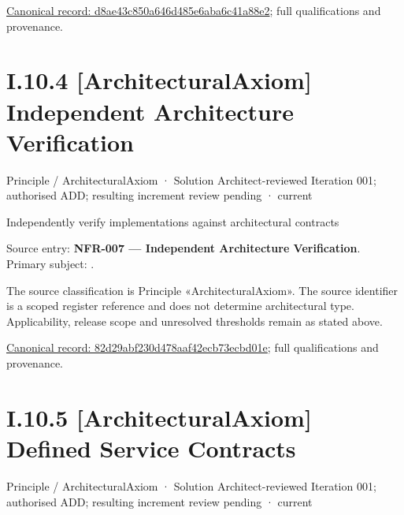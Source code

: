 {\footnotesize \href{../../../../../../../continuum/motivation/principle/architectural-axiom/d8ae43c850a646d485e6aba6c41a88e2.md}{Canonical record: d8ae43c850a646d485e6aba6c41a88e2}; full qualifications and provenance.}\par
\section*{I.10.4 [ArchitecturalAxiom] Independent Architecture Verification}
\label{navigation:I.10.4}

\label{element:82d29abf230d478aaf42ecb73ecbd01e}
{\small Principle / ArchitecturalAxiom · Solution Architect-reviewed Iteration 001; authorised ADD; resulting increment review pending · current}\par

Independently verify implementations against architectural contracts



Source entry: \textbf{NFR-007 — Independent Architecture Verification}. Primary subject: \texttt{}.



The source classification is Principle «ArchitecturalAxiom». The source identifier is a scoped register reference and does not determine architectural type. Applicability, release scope and unresolved thresholds remain as stated above.


{\footnotesize \href{../../../../../../../continuum/motivation/principle/architectural-axiom/82d29abf230d478aaf42ecb73ecbd01e.md}{Canonical record: 82d29abf230d478aaf42ecb73ecbd01e}; full qualifications and provenance.}\par
\section*{I.10.5 [ArchitecturalAxiom] Defined Service Contracts}
\label{navigation:I.10.5}

\label{element:b7d07bb4ec064272898d2f0189cffefd}
{\small Principle / ArchitecturalAxiom · Solution Architect-reviewed Iteration 001; authorised ADD; resulting increment review pending · current}\par

